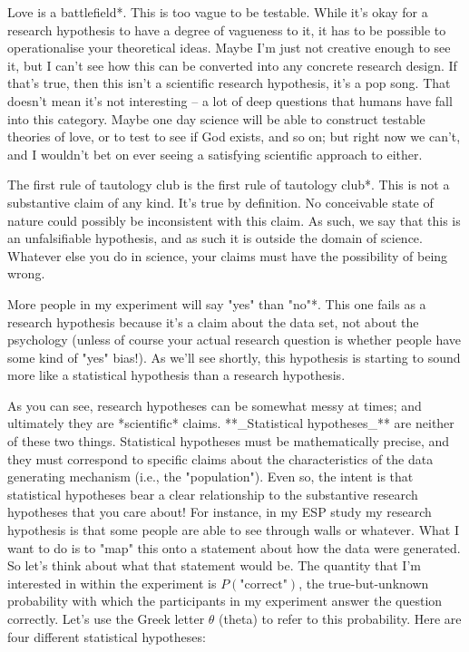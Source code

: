 \item *Love is a battlefield*. This is too vague to be testable. While it's okay for a research hypothesis to have a degree of vagueness to it, it has to be possible to operationalise your theoretical ideas. Maybe I'm just not creative enough to see it, but I can't see how this can be converted into any concrete research design. If that's true, then this isn't a scientific research hypothesis, it's a pop song. That doesn't mean it's not interesting -- a lot of deep questions that humans have fall into this category. Maybe one day science will be able to construct testable theories of love, or to test to see if God exists, and so on; but right now we can't, and I wouldn't bet on ever seeing a satisfying scientific approach to either. 
\item *The first rule of tautology club is the first rule of tautology club*. This is not a substantive claim of any kind. It's true by definition. No conceivable state of nature could possibly be inconsistent with this claim. As such, we say that this is an unfalsifiable hypothesis, and as such it is outside the domain of science. Whatever else you do in science, your claims must have the possibility of being wrong. 
\item *More people in my experiment will say "yes" than "no"*. This one fails as a research hypothesis because it's a claim about the data set, not about the psychology (unless of course your actual research question is whether people have some kind of "yes" bias!). As we'll see shortly, this hypothesis is starting to sound more like a statistical hypothesis than a research hypothesis. 


As you can see, research hypotheses can be somewhat messy at times; and ultimately they are *scientific* claims. **_Statistical hypotheses_** are neither of these two things. Statistical hypotheses must be mathematically precise, and they must correspond to specific claims about the characteristics of the data generating mechanism (i.e., the "population"). Even so, the intent is that statistical hypotheses bear a clear relationship to the substantive research hypotheses that you care about! For instance, in my ESP study my research hypothesis is that some people are able to see through walls or whatever. What I want to do is to "map" this onto a statement about how the data were generated. So let's think about what that statement would be. The quantity that I'm interested in within the experiment is $P(\mbox{"correct"})$, the true-but-unknown probability with which the participants in my experiment answer the question correctly. Let's use the Greek letter $\theta$ (theta) to refer to this probability. Here are four different statistical hypotheses:



